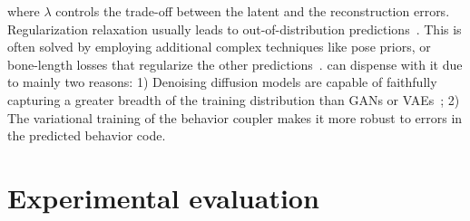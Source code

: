 \documentclass[10pt,twocolumn,letterpaper]{article}
\begin{document}
\iffalse \vspace{-0.2cm}
\begin{equation}
    \label{eq:final_loss}
\underset{1\leq i\leq k}{\min}\; \losslat(\obs, \extPred^{(i)}) + \lambda \; \underset{1\leq i\leq k}{\min}\; \lossrec(\obs, \extPred^{(i)}),
    \vspace{-0.2cm}
\end{equation}
\fi

where $\lambda$ controls the trade-off between the latent and the reconstruction errors. Regularization relaxation usually leads to out-of-distribution predictions~\cite{mao2021gsps}. This is often solved by employing additional complex techniques like pose priors, or bone-length losses that regularize the other predictions~\cite{mao2021gsps,bie2022hitdvae}. \modelname{} can dispense with it due to mainly two reasons: 1) Denoising diffusion models are capable of faithfully capturing a greater breadth of the training distribution than GANs or VAEs~\cite{dhariwal2021diffusionbeatsgans}; 2) The variational training of the behavior coupler makes it more robust to errors in the predicted behavior code. 
\section{Experimental evaluation}
\label{sec:experimental_setup}
\end{document}
